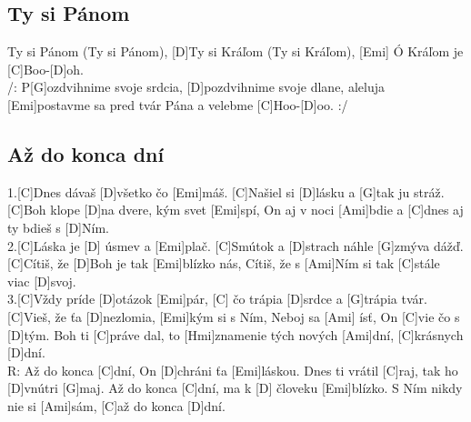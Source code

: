 \documentclass[10pt]{article}
\begin{document}
\begin{Large}
\begin{minipage}{\textwidth}
\subsection{Ty si Pánom}
\begin{guitar}
	[G]Ty si Pánom (Ty si Pánom), 
	[D]Ty si Kráľom (Ty si Kráľom),
	[Emi] Ó Kráľom je [C]Boo-[D]oh.
	\\
	/: P[G]ozdvihnime svoje srdcia,
	[D]pozdvihnime svoje dlane, aleluja
	[Emi]postavme sa pred tvár Pána 
	a velebme [C]Hoo-[D]oo. :/
\end{guitar}
\end{minipage}

\begin{minipage}{\textwidth}
\subsection{Až do konca dní}
\begin{multicols*}{2}
\begin{guitar}	
	1.[C]Dnes dávaš [D]všetko čo [Emi]máš.
	[C]Našiel si [D]lásku a [G]tak ju stráž.
	[C]Boh klope [D]na dvere, kým svet [Emi]spí,
	On aj v noci [Ami]bdie 
	a [C]dnes aj ty bdieš s [D]Ním.
	\\
	2.[C]Láska je [D] úsmev a [Emi]plač.
	[C]Smútok a [D]strach náhle [G]zmýva dážď.
	[C]Cítiš, že [D]Boh je tak [Emi]blízko nás,
	Cítiš, že s [Ami]Ním 
	si tak [C]stále viac [D]svoj.
	\\
	3.[C]Vždy príde [D]otázok [Emi]pár,
	[C] čo trápia [D]srdce a [G]trápia tvár.
	[C]Vieš, že ťa [D]nezlomia, [Emi]kým si s Ním, 
	Neboj sa [Ami] ísť, On [C]vie čo s [D]tým.
	\columnbreak
	Boh ti [C]práve dal,
	to [Hmi]znamenie tých nových [Ami]dní,
	[C]krásnych [D]dní.
	\\
	R: Až do konca [C]dní, On [D]chráni ťa [Emi]láskou.
	Dnes ti vrátil [C]raj, tak ho [D]vnútri [G]maj.
	Až do konca [C]dní, ma k [D] človeku [Emi]blízko.
	S Ním nikdy nie si [Ami]sám, [C]až do konca [D]dní.
\end{guitar}
\end{multicols*}
\end{minipage}

\begin{minipage}{\textwidth}

\end{minipage}
\end{Large}
\end{document}
